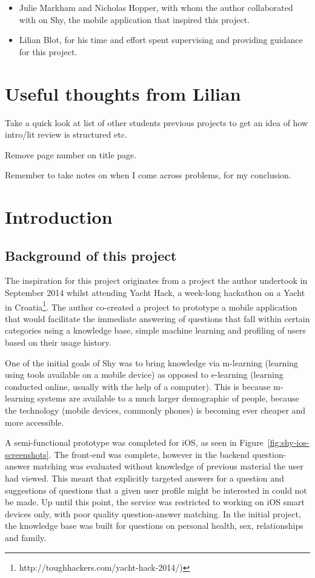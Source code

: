\documentclass{article}
\begin{document}
\begin{itemize}
  \item Julie Markham and Nicholas Hopper, with whom the author collaborated with on Shy, the mobile application that inspired this project.
  \item Lilian Blot, for his time and effort spent supervising and providing guidance for this project.
\end{itemize}


\newpage
\section{Useful thoughts from Lilian}
Take a quick look at list of other students previous projects to get an idea of how intro/lit review is structured etc.

Remove page number on title page.

Remember to take notes on when I come across problems, for my conclusion.

\newpage
\section{Introduction}

\subsection{Background of this project}

The inspiration for this project originates from a project the author undertook in September 2014 whilst attending Yacht Hack, a week-long hackathon on a Yacht in Croatia\footnote{http://toughhackers.com/yacht-hack-2014/)}.  The author co-created a project to prototype a mobile application that would facilitate the immediate answering of questions that fall within certain categories using a knowledge base, simple machine learning and profiling of users based on their usage history.

One of the initial goals of Shy was to bring knowledge via m-learning (learning using tools available on a mobile device) as opposed to e-learning (learning conducted online, usually with the help of a computer).  This is because m-learning systems are available to a much larger demographic of people, because the technology (mobile devices, commonly phones) is becoming ever cheaper and more accessible.

A semi-functional prototype was completed for iOS, as seen in Figure~\ref{fig:shy-ios-screenshots}.  The front-end was complete, however in the backend question-answer matching was evaluated without knowledge of previous material the user had viewed.  This meant that explicitly targeted answers for a question and suggestions of questions that a given user profile might be interested in could not be made.  Up until this point, the service was restricted to working on iOS smart devices only, with poor quality question-answer matching.  In the initial project, the knowledge base was built for questions on personal health, sex, relationships and family.
\end{document}
